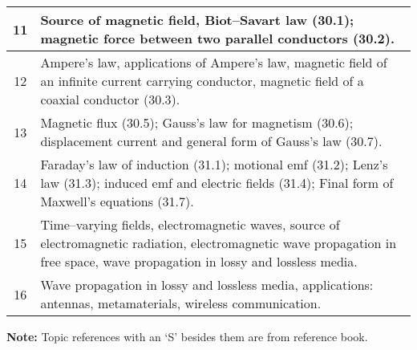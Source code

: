\documentclass[12pt,a4paper]{article}
\begin{document}
\begin{center}
\begin{longtable}{|c|p{13cm}|}
		\hline
		11 \rule{0pt}{2.6ex} & Source of magnetic field, Biot--Savart law (30.1); magnetic force between two parallel conductors (30.2).\\
		\hline
		12 \rule{0pt}{2.6ex} & Ampere's law, applications of Ampere's law, magnetic field of an infinite current carrying conductor, magnetic field of a coaxial conductor (30.3).\\
		\hline
		13 \rule{0pt}{2.6ex} & Magnetic flux (30.5); Gauss's law for magnetism (30.6); displacement current and general form of Gauss's law (30.7).\\
		\hline
		14 \rule{0pt}{2.6ex} & Faraday's law of induction (31.1); motional emf (31.2); Lenz's law (31.3); induced emf and electric fields (31.4); Final form of Maxwell's equations (31.7).\\
		\hline
		15 \rule{0pt}{2.6ex} & Time--varying fields, electromagnetic waves, source of electromagnetic radiation, electromagnetic wave propagation in free space, wave propagation in lossy and lossless media.\\
		\hline
		16 \rule{0pt}{2.6ex} & Wave propagation in lossy and lossless media, applications: antennas, metamaterials, wireless communication.\\
	\hline \hline
	\end{longtable}
\end{center}
\noindent \textbf{Note:} Topic references with an `S' besides them are from reference book.
\end{document}
